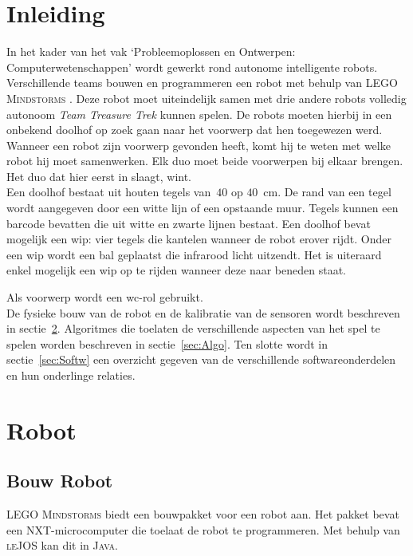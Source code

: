 \documentclass[eind]{penoverslag}
\begin{document}
\newpage
\setcounter{tocdepth}{3}
\tableofcontents
\newpage

\section{Inleiding} %
\label{ssec:Inl}
In het kader van het vak `Probleemoplossen en Ontwerpen: Computerwetenschappen' wordt gewerkt rond autonome intelligente robots. Verschillende teams bouwen en programmeren een robot met behulp van \textsc{LEGO Mindstorms} \cite{mindstorms}. Deze robot moet uiteindelijk samen met drie andere robots volledig autonoom \textit{Team Treasure Trek} kunnen spelen.
De robots moeten hierbij in een onbekend doolhof op zoek gaan naar het voorwerp dat hen toegewezen werd. Wanneer een robot zijn voorwerp gevonden heeft, komt hij te weten met welke robot hij moet samenwerken. Elk duo moet beide voorwerpen bij elkaar brengen. Het duo dat hier eerst in slaagt, wint.\\

Een doolhof bestaat uit houten tegels van~$40$ op $40$~cm. De rand van een tegel wordt aangegeven door een witte lijn of een opstaande muur. Tegels kunnen een barcode bevatten die uit witte en zwarte lijnen bestaat. Een doolhof bevat mogelijk een wip: vier tegels die kantelen wanneer de robot erover rijdt. Onder een wip wordt een bal geplaatst die infrarood licht uitzendt. Het is uiteraard enkel mogelijk een wip op te rijden wanneer deze naar beneden staat.

Als voorwerp wordt een wc-rol gebruikt.\\

De fysieke bouw van de robot en de kalibratie van de sensoren wordt beschreven in sectie~\ref{sec:Robot}. Algoritmes die toelaten de verschillende aspecten van het spel te spelen worden beschreven in sectie~\ref{sec:Algo}. Ten slotte wordt in sectie~\ref{sec:Softw} een overzicht gegeven van de verschillende softwareonderdelen en hun onderlinge relaties.

\section{Robot}
\label{sec:Robot}

\subsection{Bouw Robot}
\label{ssec:Bouw}
\textsc{LEGO Mindstorms} biedt een bouwpakket voor een robot aan. Het pakket bevat een \textsc{NXT}-microcomputer die toelaat de robot te programmeren. Met behulp van \textsc{leJOS} \cite{leJOS} kan dit in \textsc{Java}.\\
\end{document}
